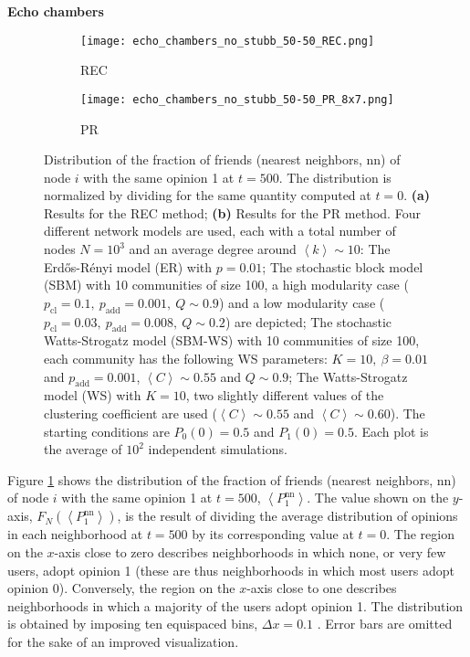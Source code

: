 \documentclass[11 pt , letterpaper , twoside , openright]{book}
\begin{document}
\newpage
\noindent
\textbf{Echo chambers}\\
\begin{figure}[H]
  \begin{subfigure}[b]{0.49\textwidth}
  	\texttt{[image: echo\_chambers\_no\_stubb\_50-50\_REC.png]}
    \caption{REC}
  \end{subfigure}
  \begin{subfigure}[b]{0.49\textwidth}
  	\texttt{[image: echo\_chambers\_no\_stubb\_50-50\_PR\_8x7.png]}
    \caption{PR}
  \end{subfigure}
  \captionsetup{format=plain}
  \caption[Distribution of the fraction of friends (nearest neighbors, nn) of node $i$ with the same opinion 1 at $t=500$, $\left<P_1^{\text{nn}}\right>$, for an initial $50/50$ opinion distribution]{Distribution of the fraction of friends (nearest neighbors, nn) of node $i$ with the same opinion 1 at $t = 500$. The distribution is normalized by dividing for the same quantity computed at $t=0$. \textbf{(a)} Results for the REC method; \textbf{(b)} Results for the PR method. Four different network models are used, each with a total number of nodes $N = 10^3$ and an average degree around $\left<k\right> \sim 10$: The Erd\H{o}s-R\'{e}nyi model (ER) with $p = 0.01$; The stochastic block model (SBM) with 10 communities of size 100, a high modularity case ($p_{\text{cl}} = 0.1,\ p_{\text{add}} = 0.001,\ Q \sim 0.9$) and a low modularity case ($p_{\text{cl}} = 0.03,\ p_{\text{add}} = 0.008,\ Q \sim 0.2$) are depicted; The stochastic Watts-Strogatz model (SBM-WS) with 10 communities of size 100, each community has the following WS parameters: $K = 10,\ \beta = 0.01$ and $p_{\text{add}} = 0.001$, $\left<C\right> \sim 0.55$ and $Q \sim 0.9$; The Watts-Strogatz model (WS) with $K = 10$, two slightly different values of the clustering coefficient are used ($\left<C\right> \sim 0.55$ and $\left<C\right> \sim 0.60$). The starting conditions are $P_0(0) = 0.5$ and $P_1(0) = 0.5$. Each plot is the average of $10^2$ independent simulations.}
\label{echo_50_50}
\end{figure}
\noindent
Figure \ref{echo_50_50} shows the distribution of the fraction of friends (nearest neighbors, nn) of node $i$ with the same opinion 1 at $t=500$, $\left<P_1^{\text{nn}}\right>$. The value shown on the $y$-axis, $F_N(\left<P_1^{\text{nn}}\right>)$, is the result of dividing the average distribution of opinions in each neighborhood at $t=500$ by its corresponding value at $t=0$. The region on the $x$-axis close to zero describes neighborhoods in which none, or very few users, adopt opinion 1 (these are thus neighborhoods in which most users adopt opinion 0). Conversely, the region on the $x$-axis close to one describes neighborhoods in which a majority of the users adopt opinion 1. The distribution is obtained by imposing ten equispaced bins, $\Delta x = 0.1$ \cite{Perra2019}. Error bars are omitted for the sake of an improved visualization.\\
\end{document}
